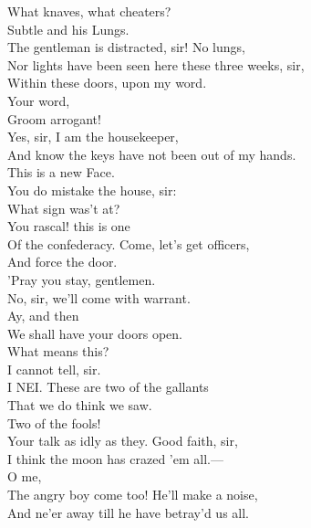 \documentclass[a4paper,oneside]{memoir}
\begin{document}
\begin{drama*}
\lovewitspeaks What knaves, what cheaters?\\
\mammonspeaks {} Subtle and his Lungs.\\
\facespeaks The gentleman is distracted, sir! No lungs,\\
Nor lights have been seen here these three weeks, sir,\\
Within these doors, upon my word.\\
\surlyspeaks {} Your word,\\
Groom arrogant!\\
\facespeaks {} Yes, sir, I am the housekeeper,\\
And know the keys have not been out of my hands.\\
\surlyspeaks This is a new Face.\\
\facespeaks {} You do mistake the house, sir:\\
What sign was't at?\\
\surlyspeaks {} You rascal! this is one\\
Of the confederacy. Come, let's get officers,\\
And force the door.\\
\lovewitspeaks {} 'Pray you stay, gentlemen.\\
\surlyspeaks No, sir, we'll come with warrant.\\
\mammonspeaks {} Ay, and then\\
We shall have your doors open.\\
\lovewitspeaks {} What means this?\\
\facespeaks I cannot tell, sir.\\
I NEI. These are two of the gallants\\
That we do think we saw.\\
\facespeaks {} Two of the fools!\\
Your talk as idly as they. Good faith, sir,\\
I think the moon has crazed 'em all.---\\
O me,\\
The angry boy come too! He'll make a noise,\\
And ne'er away till he have betray'd us all.\\

\end{drama*}
\end{document}

